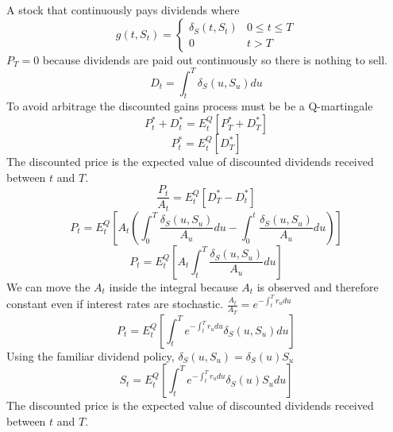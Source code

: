 A stock that continuously pays dividends where
\[
    g(t,S_t)=
    \begin{cases}
        \delta_S(t,S_t) & 0\leq t\leq T \\
        0 & t>T
    \end{cases}
\]
$P_T=0$ because dividends are paid out continuously so there is nothing to
sell.
\[D_t=\int_t^T\delta_S(u,S_u)du\]
To avoid arbitrage the discounted gains process must be be a Q-martingale
\[P_t^*+D_t^*=E_t^Q[P_T^*+D_T^*]\]
\[P_t^*=E_t^Q[D_T^*]\]
The discounted price is the expected value of discounted dividends received
between $t$ and $T$.
\[\frac{P_t}{A_t}=E_t^Q[D_T^*-D_t^*]\]
\[
    P_t=E_t^Q\left[ A_t\left( \int_0^T\frac{\delta_S(u,S_u)}{A_u}du-
    \int_0^t\frac{\delta_S(u,S_u)}{A_u}du\right) \right]
\]
\[P_t=E_t^Q\left[A_t\int_t^T\frac{\delta_S(u,S_u)}{A_u}du\right]\]
We can move the $A_t$ inside the integral because $A_t$ is observed and
therefore constant even if interest rates are stochastic.
$\frac{A_t}{A_T}=e^{-\int_t^Tr_udu}$
\[P_t=E_t^Q\left[ \int_t^Te^{-\int_t^Tr_udu}\delta_S(u,S_u)du\right]\]
Using the familiar dividend policy, $\delta_S(u,S_u)=\delta_S(u)S_u$
\[S_t=E_t^Q\left[ \int_t^Te^{-\int_t^Tr_udu}\delta_S(u)S_udu\right]\]
The discounted price is the expected value of discounted dividends received
between $t$ and $T$.
